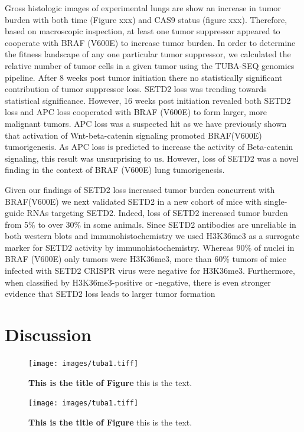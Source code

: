 Gross histologic images of experimental lungs are show an increase in tumor burden with both time (Figure xxx) and CAS9 status (figure xxx). Therefore, based on macroscopic inspection, at least one tumor suppressor appeared to cooperate with BRAF (V600E) to increase tumor burden. In order to determine the fitness landscape of any one particular tumor suppressor, we calculated the relative number of tumor cells in a given tumor using the TUBA-SEQ genomics pipeline. After 8 weeks post tumor initiation there no statistically significant contribution of tumor suppressor loss. SETD2 loss was trending towards statistical significance. However, 16 weeks post initiation revealed both SETD2 loss and APC loss cooperated with BRAF (V600E) to form larger, more malignant tumors. APC loss was a suspected hit as we have previously shown that activation of Wnt-beta-catenin signaling promoted BRAF(V600E) tumorigenesis. As APC loss is predicted to increase the activity of Beta-catenin signaling, this result was unsurprising to us. However, loss of SETD2 was a novel finding in the context of BRAF (V600E) lung tumorigenesis.

Given our findings of SETD2 loss increased tumor burden concurrent with BRAF(V600E) we next validated SETD2 in a new cohort of mice with single-guide RNAs targeting SETD2. Indeed, loss of SETD2 increased tumor burden from 5\% to over 30\% in some animals. Since SETD2 antibodies are unreliable in both western blots and immunohistochemistry we used H3K36me3 as a surrogate marker for SETD2 activity by immunohistochemistry. Whereas 90\% of nuclei in BRAF (V600E) only tumors were H3K36me3, more than 60\% tumors of mice infected with SETD2 CRISPR virus were negative for H3K36me3. Furthermore, when classified by H3K36me3-positive or -negative, there is even stronger evidence that SETD2 loss leads to larger tumor formation

\hypertarget{discussion}{%
\section{Discussion}\label{discussion}}

\begin{figure}
\hypertarget{fig:06}{%
\centering
\texttt{[image: images/tuba1.tiff]}
\caption{\textbf{This is the title of Figure} this is the text.}\label{fig:06}
}
\end{figure}

\begin{figure}
\hypertarget{fig:06}{%
\centering
\texttt{[image: images/tuba1.tiff]}
\caption{\textbf{This is the title of Figure} this is the text.}\label{fig:06}
}
\end{figure}

